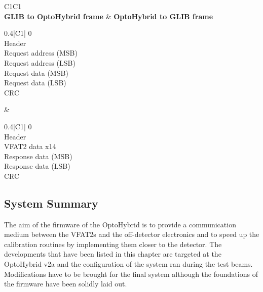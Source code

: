       \begin{table}[h!]
        \begin{tabularx}{\textwidth}{C{1}C{1}}
           \\
          \textbf{GLIB to OptoHybrid frame} & \textbf{OptoHybrid to GLIB frame} \\
          { \small
          \begin{tabularx}{0.4\textwidth}{|C{1}|}
             \hfill 0 \\ \hline
            Header \\ \hline
            Request address (MSB) \\ \hline
            Request address (LSB) \\ \hline
            Request data (MSB) \\ \hline
            Request data (LSB) \\ \hline
            CRC \\ \hline
          \end{tabularx} }
          &
          { \small
          \begin{tabularx}{0.4\textwidth}{|C{1}|}
             \hfill 0 \\ \hline
            Header \\ \hline
            VFAT2 data x14 \\ \hline
            Response data (MSB) \\ \hline
            Response data (LSB) \\ \hline
            CRC \\ \hline
          \end{tabularx} }
        \end{tabularx}
        \caption{Format of the data packets used to communicate between the GLIB and OptoHybrid on the variable latency link.}
        \label{tab:II-3-data-format}
      \end{table}

    \subsection{System Summary}

      The aim of the firmware of the OptoHybrid is to provide a communication medium between the VFAT2s and the off-detector electronics and to speed up the calibration routines by implementing them closer to the detector. The developments that have been listed in this chapter are targeted at the OptoHybrid v2a and the configuration of the system ran during the test beams. Modifications have to be brought for the final system although the foundations of the firmware have been solidly laid out.


